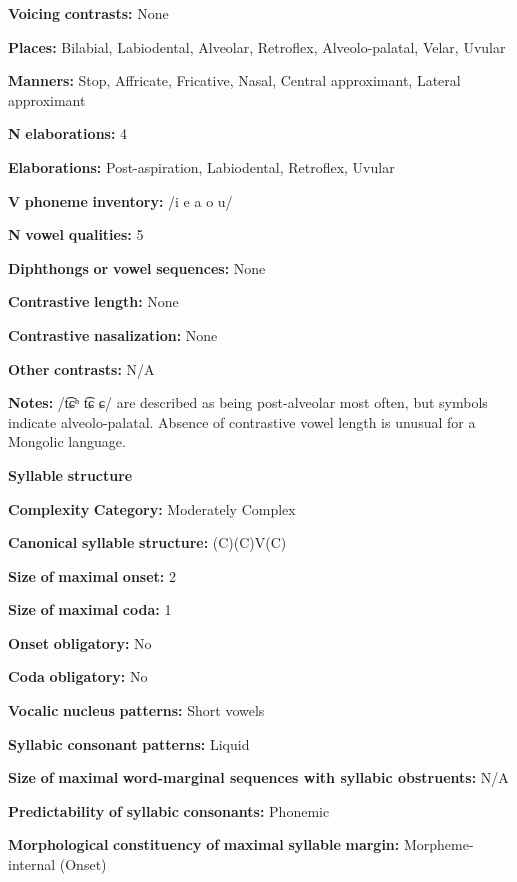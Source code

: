 \textbf{Voicing} \textbf{contrasts:} None

\textbf{Places:} Bilabial, Labiodental, Alveolar, Retroflex, Alveolo-palatal, Velar, Uvular

\textbf{Manners:} Stop, Affricate, Fricative, Nasal, Central approximant, Lateral approximant

\textbf{N} \textbf{elaborations:} 4

\textbf{Elaborations:} Post-aspiration, Labiodental, Retroflex, Uvular

\textbf{V} \textbf{phoneme} \textbf{inventory:} /i e a o u/

\textbf{N} \textbf{vowel} \textbf{qualities:} 5

\textbf{Diphthongs} \textbf{or} \textbf{vowel} \textbf{sequences:} None

\textbf{Contrastive} \textbf{length:} None

\textbf{Contrastive} \textbf{nasalization:} None

\textbf{Other} \textbf{contrasts:} N/A

\textbf{Notes:} /t͡ɕʰ t͡ɕ ɕ/ are described as being post-alveolar most often, but symbols indicate alveolo-palatal. Absence of contrastive vowel length is unusual for a Mongolic language.

\textbf{Syllable} \textbf{structure}

\textbf{Complexity} \textbf{Category:} Moderately Complex

\textbf{Canonical} \textbf{syllable} \textbf{structure:} (C)(C)V(C) \citep[54-72]{Slater2003}

\textbf{Size} \textbf{of} \textbf{maximal} \textbf{onset:} 2

\textbf{Size} \textbf{of} \textbf{maximal} \textbf{coda:} 1

\textbf{Onset} \textbf{obligatory:} No

\textbf{Coda} \textbf{obligatory:} No

\textbf{Vocalic} \textbf{nucleus} \textbf{patterns:} Short vowels

\textbf{Syllabic} \textbf{consonant} \textbf{patterns:} Liquid

\textbf{Size} \textbf{of} \textbf{maximal} \textbf{word{}-marginal sequences with syllabic obstruents:} N/A

\textbf{Predictability} \textbf{of} \textbf{syllabic} \textbf{consonants:} Phonemic

\textbf{Morphological} \textbf{constituency} \textbf{of} \textbf{maximal} \textbf{syllable} \textbf{margin:} Morpheme-internal (Onset)

